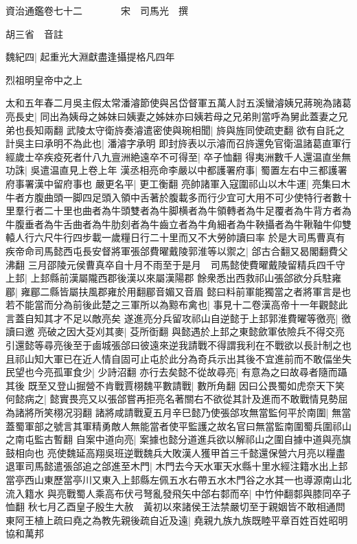 資治通鑑卷七十二　　　　宋　司馬光　撰

胡三省　音註

魏紀四|{
	起重光大淵獻盡逢攝提格凡四年}


烈祖明皇帝中之上

太和五年春二月吳主假太常潘濬節使與呂岱督軍五萬人討五溪蠻濬姨兄蔣琬為諸葛亮長史|{
	同出為姨母之姊妹曰姨妻之姊妹亦曰姨若母之兄弟則當呼為舅此蓋妻之兄弟也長知兩翻}
武陵太守衛旍奏濬遣密使與琬相聞|{
	旍與旌同使疏吏翻}
欲有自託之計吳主曰承明不為此也|{
	潘濬字承明}
即封旍表以示濬而召旍還免官衛温諸葛直軍行經歲士卒疾疫死者什八九亶洲絶遠卒不可得至|{
	卒子恤翻}
得夷洲數千人還温直坐無功誅|{
	吳遣温直見上卷上年}
漢丞相亮命李嚴以中都護署府事|{
	蜀置左右中三都護署府事署漢中留府事也}
嚴更名平|{
	更工衡翻}
亮帥諸軍入寇圍祁山以木牛運|{
	亮集曰木牛者方腹曲頭一脚四足頭入領中舌著於腹載多而行少宜可大用不可少使特行者數十里羣行者二十里也曲者為牛頭雙者為牛脚横者為牛領轉者為牛足覆者為牛背方者為牛腹垂者為牛舌曲者為牛肋刻者為牛齒立者為牛角細者為牛鞅攝者為牛鞦䩜牛仰雙轅人行六尺牛行四步載一歲糧日行二十里而又不大勞帥讀曰率}
於是大司馬曹真有疾帝命司馬懿西屯長安督將軍張郃費曜戴陵郭淮等以禦之|{
	郃古合翻又曷閣翻費父沸翻}
三月邵陵元侯曹真卒自十月不雨至于是月　司馬懿使費曜戴陵留精兵四千守上邽|{
	上邽縣前漢屬隴西郡後漢以來屬漢陽郡}
餘衆悉出西救祁山張郃欲分兵駐雍郿|{
	雍郿二縣皆屬扶風郡雍於用翻郿音媚又音眉}
懿曰料前軍能獨當之者將軍言是也若不能當而分為前後此楚之三軍所以為黥布禽也|{
	事見十二卷漢高帝十一年觀懿此言蓋自知其才不足以敵亮矣}
遂進亮分兵留攻祁山自逆懿于上邽郭淮費曜等徼亮|{
	徼讀曰邀}
亮破之因大芟刈其麥|{
	芟所衘翻}
與懿遇於上邽之東懿歛軍依險兵不得交亮引還懿等尋亮後至于鹵城張郃曰彼遠來逆我請戰不得謂我利在不戰欲以長計制之也且祁山知大軍已在近人情自固可止屯於此分為奇兵示出其後不宜進前而不敢偪坐失民望也今亮孤軍食少|{
	少詩沼翻}
亦行去矣懿不從故尋亮|{
	有意為之曰故尋者隨而躡其後}
既至又登山掘營不肯戰賈栩魏平數請戰|{
	數所角翻}
因曰公畏蜀如虎奈天下笑何懿病之|{
	懿實畏亮又以張郃嘗再拒亮名著關右不欲從其計及進而不敢戰情見勢屈為諸將所笑栩况羽翻}
諸將咸請戰夏五月辛巳懿乃使張郃攻無當監何平於南圍|{
	無當蓋蜀軍部之號言其軍精勇敵人無能當者使平監護之故名官曰無當監南圍蜀兵圍祁山之南屯監古暫翻}
自案中道向亮|{
	案據也懿分道進兵欲以解祁山之圍自據中道與亮旗鼓相向也}
亮使魏延高翔吳班逆戰魏兵大敗漢人獲甲首三千懿還保營六月亮以糧盡退軍司馬懿遣張郃追之郃進至木門|{
	木門去今天水軍天水縣十里水經注籍水出上邽當亭西山東歷當亭川又東入上邽縣左佩五水右帶五水木門谷之水其一也導源南山北流入籍水}
與亮戰蜀人乘高布伏弓弩亂發飛矢中郃右䣛而卒|{
	中竹仲翻䣛與膝同卒子恤翻}
秋七月乙酉皇子殷生大赦　黃初以來諸侯王法禁嚴切至于親姻皆不敢相通問東阿王植上疏曰堯之為教先親後疏自近及遠|{
	堯親九族九族既睦平章百姓百姓昭明協和萬邦}
